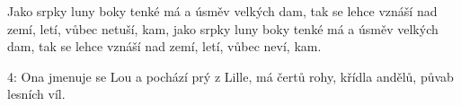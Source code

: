 \repeatingchorus{}
\beginchorus{}
\chordsoff{}
Jako srpky luny boky tenké má a úsměv velkých dam,
tak se lehce vznáší nad zemí, letí, vůbec netuší, kam,
jako srpky luny boky tenké má a úsměv velkých dam,
tak se lehce vznáší nad zemí, letí, vůbec neví, kam.
\chordson{}
\endchorus{}

\beginverse{}
\chordsoff{}
4: Ona jmenuje se Lou a pochází prý z Lille,
má čertů rohy, křídla andělů, půvab lesních víl.        
\chordson{}
\endverse{}

\endsong{}
